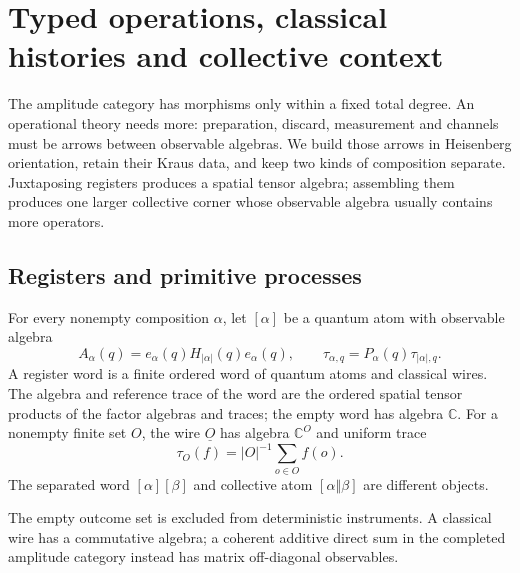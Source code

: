 \clearpage
\section{Typed operations, classical histories and collective context}
\label{sec:f1-limit-operations}

The amplitude category has morphisms only within a fixed total degree.  An
operational theory needs more: preparation, discard, measurement and channels
must be arrows between observable algebras.  We build those arrows in
Heisenberg orientation, retain their Kraus data, and keep two kinds of
composition separate.  Juxtaposing registers produces a spatial tensor
algebra; assembling them produces one larger collective corner whose
observable algebra usually contains more operators.

\subsection{Registers and primitive processes}

\begin{definition}
For every nonempty composition $\alpha$, let $[\alpha]$ be a quantum atom
with observable algebra
\[
 A_\alpha(q)=e_\alpha(q)H_{|\alpha|}(q)e_\alpha(q),
 \qquad \tau_{\alpha,q}=P_\alpha(q)\tau_{|\alpha|,q}.
\]
A register word is a finite ordered word of quantum atoms and classical
wires.  The algebra and reference trace of the word are the ordered spatial
tensor products of the factor algebras and traces; the empty word has algebra
$\mathbb C$.  For a nonempty finite set $O$, the wire $\underline O$ has
algebra $\mathbb C^O$ and uniform trace
\[
 \tau_O(f)=|O|^{-1}\sum_{o\in O}f(o).
\]
The separated word $[\alpha][\beta]$ and collective atom
$[\alpha\mathbin\Vert\beta]$ are different objects.
\end{definition}
\begin{scope}
The empty outcome set is excluded from deterministic instruments.  A
classical wire has a commutative algebra; a coherent additive direct sum in
the completed amplitude category instead has matrix off-diagonal observables.
\end{scope}

